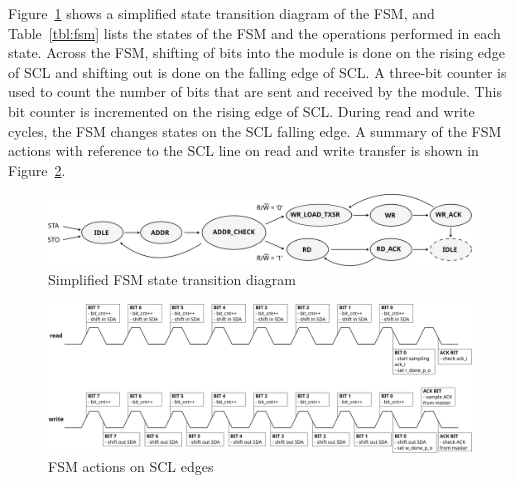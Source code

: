 \documentclass[a4paper,11pt]{article}
\begin{document}
Figure~\ref{fig:fsm-diag} shows a simplified state transition diagram of the FSM,
and Table~\ref{tbl:fsm} lists the states of the FSM and the operations performed in each
state. Across the FSM, shifting of bits into the module is done on the rising edge
of SCL and shifting out is done on the falling edge of SCL. A three-bit counter is
used to count the number of bits that are sent and received by the module. This bit
counter is incremented on the rising edge of SCL. During read and write cycles, the
FSM changes states on the SCL falling edge. A summary of the FSM actions with
reference to the SCL line on read and write transfer is shown in
Figure~\ref{fig:fsm-and-scl}.

\begin{figure}[h]
  \centerline{\includegraphics[width=\textwidth]{fig/fsm-diag}}
  \caption{Simplified FSM state transition diagram}
  \label{fig:fsm-diag}
\end{figure}

\begin{figure}[h]
  \centerline{\includegraphics[width=\textwidth]{fig/fsm-and-scl}}
  \caption{FSM actions on SCL edges}
  \label{fig:fsm-and-scl}
\end{figure}
\end{document}

